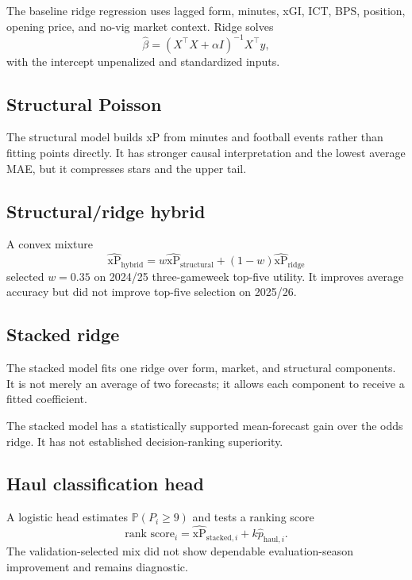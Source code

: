 \documentclass[11pt,a4paper]{article}
\newcommand{\xp}{\widehat{\mathrm{xP}}}
\newcommand{\Prob}{\mathbb{P}}
\begin{document}
The baseline ridge regression uses lagged form, minutes, xGI, ICT, BPS, position, opening price, and no-vig market context. Ridge solves
\begin{equation}
  \widehat\beta=(X^\top X+\alpha I)^{-1}X^\top y,
\end{equation}
with the intercept unpenalized and standardized inputs.

\subsection{Structural Poisson}

The structural model builds xP from minutes and football events rather than fitting points directly. It has stronger causal interpretation and the lowest average MAE, but it compresses stars and the upper tail.

\subsection{Structural/ridge hybrid}

A convex mixture
\begin{equation}
  \xp_{\text{hybrid}}=w\xp_{\text{structural}}+(1-w)\xp_{\text{ridge}}
\end{equation}
selected $w=0.35$ on 2024/25 three-gameweek top-five utility. It improves average accuracy but did not improve top-five selection on 2025/26.

\subsection{Stacked ridge}

The stacked model fits one ridge over form, market, and structural components. It is not merely an average of two forecasts; it allows each component to receive a fitted coefficient.

The stacked model has a statistically supported mean-forecast gain over the odds ridge. It has not established decision-ranking superiority.

\subsection{Haul classification head}

A logistic head estimates $\Prob(P_i\geq 9)$ and tests a ranking score
\begin{equation}
  \text{rank score}_i=\xp_{\text{stacked},i}+k\widehat p_{\text{haul},i}.
\end{equation}
The validation-selected mix did not show dependable evaluation-season improvement and remains diagnostic.
\end{document}
